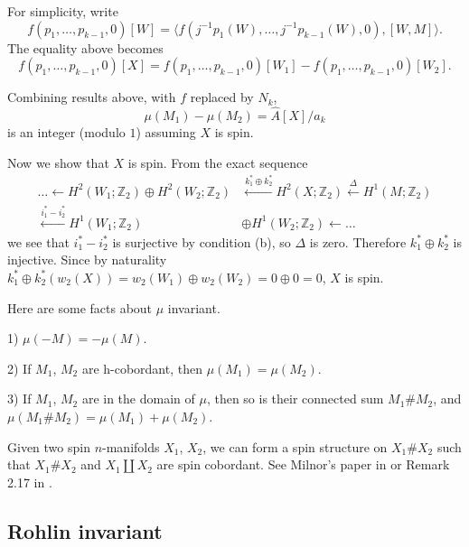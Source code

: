 \documentclass[twoside]{article}
\begin{document}
{	For simplicity, write 
	\[
	    f(p_{1}, \ldots, p_{k-1}, 0)[W] =
	    \langle f(j^{-1}p_{1}(W), \ldots, j^{-1}p_{k-1}(W), 0),[W,M]\rangle. 
	\]
	The equality above becomes
	\[
	f(p_{1}, \ldots, p_{k-1}, 0)[X] = f(p_{1}, \ldots, p_{k-1}, 0)[W_{1}]-f(p_{1}, \ldots, p_{k-1}, 0)[W_{2}]. 
	\]
	
	Combining results above, with $f$ replaced by $N_k$, 
	\[
	\mu(M_1)-\mu(M_2) = \widehat{A}[X]/a_k 
	\]
	is an integer (modulo $1$) assuming $X$ is spin. 
	
	Now we show that $X$ is spin. From the exact sequence
	\begin{align*}
	\dots   \leftarrow H^{2}(W_{1} ; \mathbb{Z}_{2})  \oplus  H^{2}(W_{2} ; \mathbb{Z}_{2})& \stackrel{k_{1}^{*}  \oplus  k_{2}^{*}}{\leftarrow} {H^{2}}(X ; \mathbb{Z}_{2}) \stackrel{\Delta}{\leftarrow}{H}^{1}(M ; \mathbb{Z}_{2}) \\
	\stackrel{i_{1}^{*} - i_{2}^{*}}{\leftarrow}H^{1}(W_{1} ; \mathbb{Z}_{2}) & \oplus  H^{1}(W_{2} ; \mathbb{Z}_{2})\leftarrow  \dots  
	\end{align*}
	we see that $i_{1}^{*} - i_{2}^{*}$ is surjective by condition (b), so $\Delta$ is zero. Therefore $k_{1}^{*}  \oplus  k_{2}^{*}$ is injective. Since by naturality $k_{1}^{*}  \oplus  k_{2}^{*}(w_2(X)) = w_2(W_1) \oplus  w_2(W_2) = 0 \oplus  0 = 0$, $X$ is spin. \qedhere}

Here are some facts about $\mu$ invariant. 

\begin{prop}
	
	1) $\mu(-M) = -\mu(M)$. 
	
	2) If $M_1$, $M_2$ are h-cobordant, then $\mu(M_1) = \mu(M_2)$. 
	
	3) If $M_1$, $M_2$ are in the domain of $\mu$, then so is their connected sum $M_1 \#  M_2$, and $\mu(M_1 \#  M_2) = \mu(M_1) + \mu(M_2)$. 
\end{prop}

Given two spin $n$-manifolds $X_1$, $X_2$, we can form a spin structure on $X_1 \#  X_2$ such that $X_1 \#  X_2$ and $X_1\coprod X_2$ are spin cobordant. See Milnor's paper in \cite{milnorspin} or Remark 2.17 in \cite{lawsonspin}. 







\subsection{Rohlin invariant}
\end{document}
